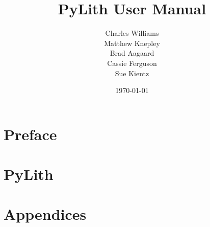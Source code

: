 \documentclass{report}
\begin{document}
\title{PyLith User Manual}
\author{Charles Williams\\
  Matthew Knepley\\
  Brad Aagaard\\
  Cassie Ferguson\\
  Sue Kientz}
\date{\today}
  
\maketitle

\part{Preface}



\part{PyLith}





\part{Appendices}



\end{document}
